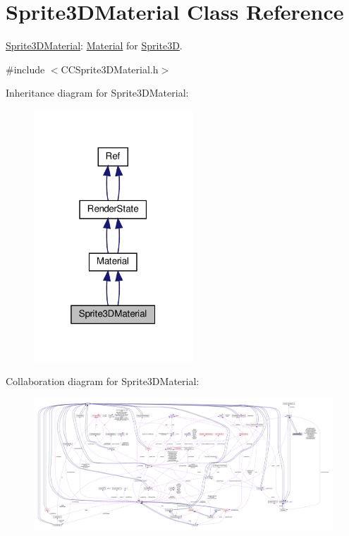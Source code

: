 \hypertarget{classSprite3DMaterial}{}\section{Sprite3\+D\+Material Class Reference}
\label{classSprite3DMaterial}


\hyperlink{classSprite3DMaterial}{Sprite3\+D\+Material}\+: \hyperlink{classMaterial}{Material} for \hyperlink{classSprite3D}{Sprite3D}.  




{\ttfamily \#include $<$C\+C\+Sprite3\+D\+Material.\+h$>$}



Inheritance diagram for Sprite3\+D\+Material\+:
\nopagebreak
\begin{figure}[H]
\begin{center}
\leavevmode
\includegraphics[width=169pt]{classSprite3DMaterial__inherit__graph}
\end{center}
\end{figure}


Collaboration diagram for Sprite3\+D\+Material\+:
\nopagebreak
\begin{figure}[H]
\begin{center}
\leavevmode
\includegraphics[width=350pt]{classSprite3DMaterial__coll__graph}
\end{center}
\end{figure}
